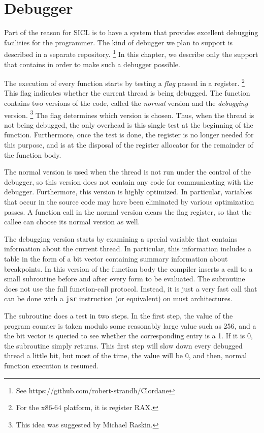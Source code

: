 \chapter{Debugger}
\label{chap-debugger}

Part of the reason for SICL is to have a system that provides
excellent debugging facilities for the programmer.  The kind of
debugger we plan to support is described in a separate repository.%
\footnote{See https://github.com/robert-strandh/Clordane}  In this
chapter, we describe only the support that \sysname{} contains in
order to make such a debugger possible.

The execution of every function starts by testing a \emph{flag} passed
in a register.%
\footnote{For the x86-64 platform, it is register RAX.}
This flag indicates whether the current thread is being debugged.  The
function contains two versions of the code, called the \emph{normal}
version and the \emph{debugging} version.%
\footnote{This idea was suggested by Michael Raskin.}
The flag determines which version is chosen.  Thus, when the thread is
not being debugged, the only overhead is this single test at the
beginning of the function.  Furthermore, once the test is done, the
register is no longer needed for this purpose, and is at the disposal
of the register allocator for the remainder of the function body.

The normal version is used when the thread is not run under the
control of the debugger, so this version does not contain any code for
communicating with the debugger.  Furthermore, this version is highly
optimized.  In particular, variables that occur in the source code may
have been eliminated by various optimization passes.  A function call
in the normal version clears the flag register, so that the callee can
choose its normal version as well.

The debugging version starts by examining a special variable that
contains information about the current thread.  In particular, this
information includes a table in the form of a bit vector containing
summary information about breakpoints.  In this version of the
function body the compiler inserts a call to a small subroutine before
and after every form to be evaluated.  The subroutine does not use the
full \commonlisp{} function-call protocol.  Instead, it is just a very
fast call that can be done with a \texttt{jsr} instruction (or
equivalent) on must architectures.

The subroutine does a test in two steps.  In the first step, the value
of the program counter is taken modulo some reasonably large value
such as 256, and a the bit vector is queried to see whether the
corresponding entry is a 1.  If it is 0, the subroutine simply
returns.  This first step will slow down every debugged thread a
little bit, but most of the time, the value will be 0, and then,
normal function execution is resumed.

